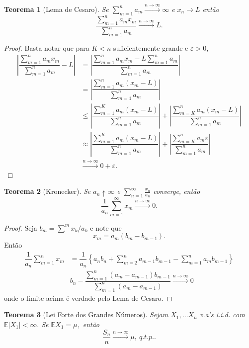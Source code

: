 \documentclass[12pt,a4paper,oneside]{book}
\newtheorem{theorem}{Teorema}[section]
\theoremstyle{definition}
\theoremstyle{remark}
\numberwithin{equation}{section}
\newcommand{\e}{\varepsilon}
\newcommand{\E}{\mathbb{E}}
\newcommand{\ds}{\displaystyle}
\newcommand{\rarrowlimn}{\xrightarrow{n\rightarrow \infty}}
\begin{document}
\begin{theorem}[Lema de Cesaro] Se $\sum_{m=1}^n a_m \rarrowlimn \infty$ e $x_n \rightarrow L$ então
$$\ds\dfrac{\sum^n_{m=1}a_mx_m}{\sum^n_{m=1} a_m}\rarrowlimn L. $$

\end{theorem}
\begin{proof}
Basta notar que para $K< n$ suficientemente grande e $\e>0$,
\begin{align*}
\left| \dfrac{\sum^n_{m=1}a_mx_m}{\sum^n_{m=1} a_m} - L \right| & =   \left| \ds\dfrac{\sum^n_{m=1}a_mx_m - L\sum^n_{m=1} a_m}{\sum^n_{m=1} a_m} \right|\\
 & = \left| \dfrac{\sum^n_{m=1}a_m(x_m-L) }{\sum^n_{m=1} a_m} \right|\\
 & \leq \left| \dfrac{\sum^K_{m=1}a_m(x_m-L) }{\sum^n_{m=1} a_m} \right|+\left| \dfrac{\sum^n_{m=K}a_m(x_m-L) }{\sum^n_{m=1} a_m} \right|\\
 & \approx \left| \dfrac{\sum^K_{m=1}a_m(x_m-L) }{\sum^n_{m=1} a_m} \right|+\left| \dfrac{\sum^n_{m=K}a_m \e }{\sum^n_{m=1} a_m} \right|\\
 & \rarrowlimn 0+\e.
\end{align*}
\end{proof}

\begin{theorem}[Kronecker] Se $a_n\uparrow \infty$ e 
$\sum^\infty_{n=1}\frac{x_n}{a_n} $
converge, então
$$\frac{1}{a_n}\sum^\infty_{m=1}x_m \rarrowlimn  0. $$
\end{theorem}



\begin{proof}
Seja $b_m = \sum^m x_k/a_k$ e note que
$$x_m = a_m(b_m-b_{m-1}). $$ Então
\begin{align*}
\dfrac{1}{a_n} \sum^n_{m=1}x_m & = \dfrac{1}{a_n}\left\lbrace a_nb_n + \sum^n_{m=2}a_{m-1}b_{m-1} - \sum^n_{m=1}a_mb_{m-1} \right\rbrace\\
& b_n - \dfrac{\sum^n_{m=1}(a_m-a_{m-1})b_{m-1}}{\sum^n_{m=1}(a_m-a_{m-1})} \rarrowlimn 0
\end{align*}
onde o limite acima é verdade pelo Lema de Cesaro.
\end{proof}



\begin{tcolorbox}
\begin{theorem}[Lei Forte dos Grandes Números] Sejam $X_1,\dots X_n$ v.a's i.i.d. com $\E|X_1|<\infty.$ Se $\E X_1=\mu,$ então
$$ \dfrac{S_n}{n}\rarrowlimn \mu,\ q.t.p.. $$

\end{theorem}
\end{tcolorbox}
\end{document}
